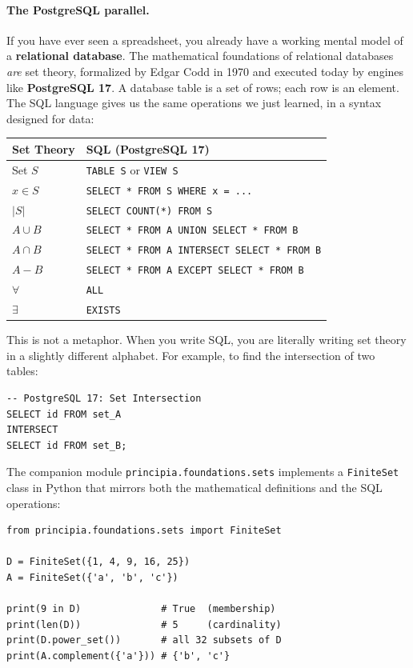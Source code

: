 \paragraph{The PostgreSQL parallel.}
If you have ever seen a spreadsheet, you already have a working mental model
of a \textbf{relational database}. The mathematical foundations of relational databases \emph{are} set theory, formalized by Edgar Codd in 1970 and executed today by engines like \textbf{PostgreSQL 17}. A database table is a set of rows; each row is an element. The SQL language gives us the same operations we just learned, in a syntax designed for data:
\begin{center}
\begin{tabular}{@{}ll@{}}
\toprule
\textbf{Set Theory} & \textbf{SQL (PostgreSQL 17)} \\
\midrule
Set $S$            & \texttt{TABLE S} or \texttt{VIEW S} \\
$x \in S$          & \texttt{SELECT * FROM S WHERE x = ...} \\
$|S|$              & \texttt{SELECT COUNT(*) FROM S} \\
$A \cup B$         & \texttt{SELECT * FROM A UNION SELECT * FROM B} \\
$A \cap B$         & \texttt{SELECT * FROM A INTERSECT SELECT * FROM B} \\
$A - B$            & \texttt{SELECT * FROM A EXCEPT SELECT * FROM B} \\
$\forall$          & \texttt{ALL} \\
$\exists$          & \texttt{EXISTS} \\
\bottomrule
\end{tabular}
\end{center}

\noindent This is not a metaphor. When you write SQL, you are literally writing set theory in a slightly different alphabet. For example, to find the intersection of two tables:
\begin{verbatim}
-- PostgreSQL 17: Set Intersection
SELECT id FROM set_A
INTERSECT
SELECT id FROM set_B;
\end{verbatim}

The companion module \texttt{principia.foundations.sets} implements a
\texttt{FiniteSet} class in Python that mirrors both the mathematical
definitions and the SQL operations:

\begin{verbatim}
from principia.foundations.sets import FiniteSet

D = FiniteSet({1, 4, 9, 16, 25})
A = FiniteSet({'a', 'b', 'c'})

print(9 in D)              # True  (membership)
print(len(D))              # 5     (cardinality)
print(D.power_set())       # all 32 subsets of D
print(A.complement({'a'})) # {'b', 'c'}
\end{verbatim}



